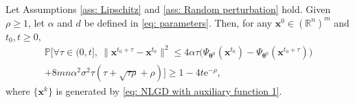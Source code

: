 \documentclass{siamart251216}
\begin{document}
\begin{lemma}
    \label{lem: Improve or Localize}
    Let Assumptions \ref{ass: Lipschitz} and \ref{ass: Random perturbation} hold. Given $\rho\geq1$, let $\alpha$ and $d$ be defined in \eqref{eq: parameters}. Then, for any $\mathbf{x}^{0}\in(\mathbb{R}^{n})^{m}$ and $t_{0},t\geq0$,
    \begin{multline*}
        \mathbb{P}\Big[\forall\tau\in(0,t],~\|\mathbf{x}^{t_{0}+\tau}-\mathbf{x}^{t_{0}}\|^{2}
        \leq4\alpha\tau\big(\Psi_{\boldsymbol{\theta}^{0}}(\mathbf{x}^{t_{0}})-\Psi_{\boldsymbol{\theta}^{0}}(\mathbf{x}^{t_{0}+\tau})\big)\\
        +8mn\alpha^{2}\sigma^{2}\tau(\tau+\sqrt{\tau\rho}+\rho)\Big]\geq1-4t\mathrm{e}^{-\rho},
    \end{multline*}
    where $\{\mathbf{x}^{k}\}$ is generated by \eqref{eq: NLGD with auxiliary function 1}.
\end{lemma}
\end{document}
